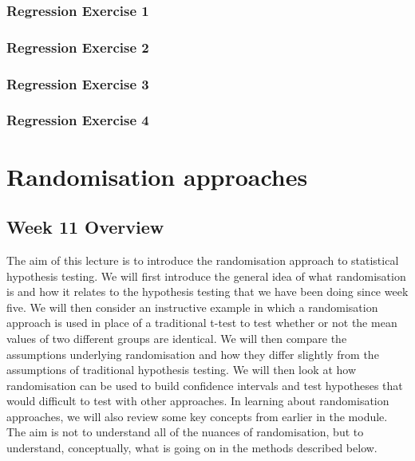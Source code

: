 \documentclass[
]{scrbook}
\begin{document}
\hypertarget{regression-exercise-1}{%
\section{Regression Exercise 1}\label{regression-exercise-1}}

\hypertarget{regression-exercise-2}{%
\section{Regression Exercise 2}\label{regression-exercise-2}}

\hypertarget{regression-exercise-3}{%
\section{Regression Exercise 3}\label{regression-exercise-3}}

\hypertarget{regression-exercise-4}{%
\section{Regression Exercise 4}\label{regression-exercise-4}}

\hypertarget{part-randomisation-approaches}{%
\part{Randomisation approaches}\label{part-randomisation-approaches}}

\hypertarget{Week11}{%
\chapter*{Week 11 Overview}\label{Week11}}

The aim of this lecture is to introduce the randomisation approach to statistical hypothesis testing. We will first introduce the general idea of what randomisation is and how it relates to the hypothesis testing that we have been doing since week five. We will then consider an instructive example in which a randomisation approach is used in place of a traditional t-test to test whether or not the mean values of two different groups are identical. We will then compare the assumptions underlying randomisation and how they differ slightly from the assumptions of traditional hypothesis testing. We will then look at how randomisation can be used to build confidence intervals and test hypotheses that would difficult to test with other approaches. In learning about randomisation approaches, we will also review some key concepts from earlier in the module. The aim is not to understand all of the nuances of randomisation, but to understand, conceptually, what is going on in the methods described below.
\end{document}
